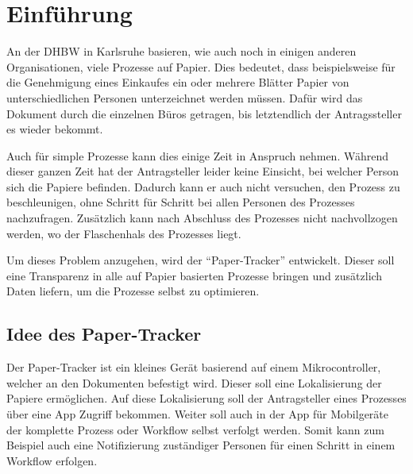 \chapter{Einführung}

An der \gls{DHBW} in Karlsruhe basieren, wie auch noch in einigen anderen Organisationen, viele Prozesse auf Papier.
Dies bedeutet, dass beispielsweise für die Genehmigung eines Einkaufes ein oder mehrere Blätter Papier von unterschiedlichen Personen unterzeichnet werden müssen.
Dafür wird das Dokument durch die einzelnen Büros getragen, bis letztendlich der Antragssteller es wieder bekommt.

Auch für simple Prozesse kann dies einige Zeit in Anspruch nehmen.
Während dieser ganzen Zeit hat der Antragsteller leider keine Einsicht, bei welcher Person sich die Papiere befinden.
Dadurch kann er auch nicht versuchen, den Prozess zu beschleunigen, ohne Schritt für Schritt bei allen Personen des Prozesses nachzufragen.
Zusätzlich kann nach Abschluss des Prozesses nicht nachvollzogen werden, wo der Flaschenhals des Prozesses liegt.

Um dieses Problem anzugehen, wird der \enquote{Paper-Tracker} entwickelt.
Dieser soll eine Transparenz in alle auf Papier basierten Prozesse bringen und zusätzlich Daten liefern, um die Prozesse selbst zu optimieren.

\section{Idee des Paper-Tracker}

Der Paper-Tracker ist ein kleines Gerät basierend auf einem Mikrocontroller, welcher an den Dokumenten befestigt wird.
Dieser soll eine Lokalisierung der Papiere ermöglichen.
Auf diese Lokalisierung soll der Antragsteller eines Prozesses über eine App Zugriff bekommen.
Weiter soll auch in der App für Mobilgeräte der komplette Prozess oder Workflow selbst verfolgt werden.
Somit kann zum Beispiel auch eine Notifizierung zuständiger Personen für einen Schritt in einem Workflow erfolgen.
